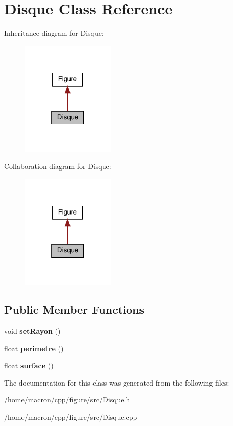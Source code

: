 \hypertarget{classDisque}{}\section{Disque Class Reference}
\label{classDisque}


Inheritance diagram for Disque\+:
\nopagebreak
\begin{figure}[H]
\begin{center}
\leavevmode
\includegraphics[width=127pt]{classDisque__inherit__graph}
\end{center}
\end{figure}


Collaboration diagram for Disque\+:
\nopagebreak
\begin{figure}[H]
\begin{center}
\leavevmode
\includegraphics[width=127pt]{classDisque__coll__graph}
\end{center}
\end{figure}
\subsection*{Public Member Functions}
\begin{DoxyCompactItemize}
\item 
\mbox{\label{classDisque_a5c2ef8ccfa24309f18acaa6b21b1d7b3}} 
void {\bfseries set\+Rayon} ()
\item 
\mbox{\label{classDisque_a7c0cc5813b36ab93977fb0f66aa5e470}} 
float {\bfseries perimetre} ()
\item 
\mbox{\label{classDisque_aacd8d27b8d47bea0cb749dac208710c8}} 
float {\bfseries surface} ()
\end{DoxyCompactItemize}


The documentation for this class was generated from the following files\+:\begin{DoxyCompactItemize}
\item 
/home/macron/cpp/figure/src/Disque.\+h\item 
/home/macron/cpp/figure/src/Disque.\+cpp\end{DoxyCompactItemize}
